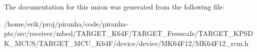 The documentation for this union was generated from the following file\+:\begin{DoxyCompactItemize}
\item 
/home/erik/proj/piranha/code/piranha-\/ptc/src/receiver/mbed/\+T\+A\+R\+G\+E\+T\+\_\+\+K64\+F/\+T\+A\+R\+G\+E\+T\+\_\+\+Freescale/\+T\+A\+R\+G\+E\+T\+\_\+\+K\+P\+S\+D\+K\+\_\+\+M\+C\+U\+S/\+T\+A\+R\+G\+E\+T\+\_\+\+M\+C\+U\+\_\+\+K64\+F/device/device/\+M\+K64\+F12/M\+K64\+F12\+\_\+rcm.\+h\end{DoxyCompactItemize}
